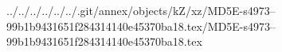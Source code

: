 ../../../../../../.git/annex/objects/kZ/xz/MD5E-s4973--99b1b9431651f284314140e45370ba18.tex/MD5E-s4973--99b1b9431651f284314140e45370ba18.tex